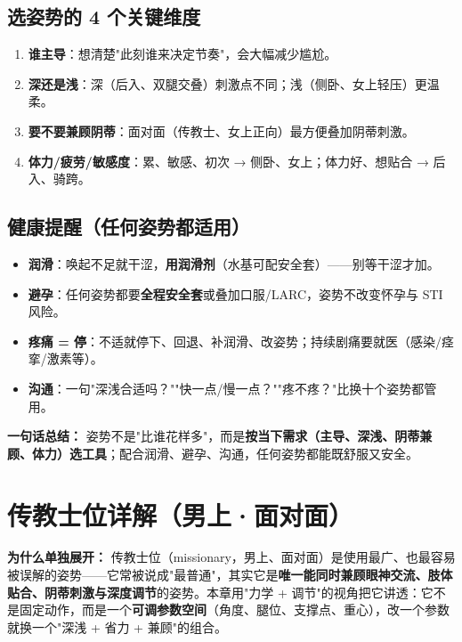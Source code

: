 \documentclass[12pt,UTF8,openany]{ctexbook}
\begin{document}
\section{选姿势的 4 个关键维度}

\begin{enumerate}[leftmargin=2em,itemsep=0.3em]
  \item \textbf{谁主导}：想清楚"此刻谁来决定节奏"，会大幅减少尴尬。
  \item \textbf{深还是浅}：深（后入、双腿交叠）刺激点不同；浅（侧卧、女上轻压）更温柔。
  \item \textbf{要不要兼顾阴蒂}：面对面（传教士、女上正向）最方便叠加阴蒂刺激。
  \item \textbf{体力/疲劳/敏感度}：累、敏感、初次 → 侧卧、女上；体力好、想贴合 → 后入、骑跨。
\end{enumerate}

\section{健康提醒（任何姿势都适用）}

\begin{itemize}[leftmargin=2em,itemsep=0.3em]
  \item \textbf{润滑}：唤起不足就干涩，\textbf{用润滑剂}（水基可配安全套）——别等干涩才加。
  \item \textbf{避孕}：任何姿势都要\textbf{全程安全套}或叠加口服/LARC，姿势不改变怀孕与 STI 风险。
  \item \textbf{疼痛 = 停}：不适就停下、回退、补润滑、改姿势；持续剧痛要就医（感染/痉挛/激素等）。
  \item \textbf{沟通}：一句"深浅合适吗？""快一点/慢一点？""疼不疼？"比换十个姿势都管用。
\end{itemize}

\vspace{1em}
\noindent\textbf{一句话总结：} 姿势不是"比谁花样多"，而是\textbf{按当下需求（主导、深浅、阴蒂兼顾、体力）选工具}；配合润滑、避孕、沟通，任何姿势都能既舒服又安全。

\chapter{传教士位详解（男上·面对面）}
\label{chap:missionary}

\noindent\textbf{为什么单独展开：} 传教士位（missionary，男上、面对面）是使用最广、也最容易被误解的姿势——它常被说成"最普通"，其实它是\textbf{唯一能同时兼顾眼神交流、肢体贴合、阴蒂刺激与深度调节}的姿势。本章用"力学 + 调节"的视角把它讲透：它不是固定动作，而是一个\textbf{可调参数空间}（角度、腿位、支撑点、重心），改一个参数就换一个"深浅 + 省力 + 兼顾"的组合。
\end{document}
